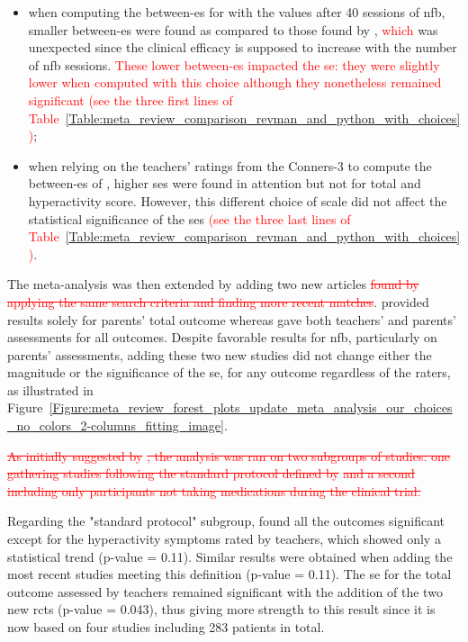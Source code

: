 \begin{itemize}
    \item when computing the between-\gls{es} for \citet{Arnold2014} with the values after 40 sessions of \gls{nfb}, 
      smaller between-\gls{es} were found as compared to those found by \citet{Cortese2016}, \textcolor{red}{which} was unexpected since  
			the clinical efficacy is supposed to increase with the number of \gls{nfb} sessions. \textcolor{red}{These lower between-\gls{es}
			impacted the \gls{se}: they were slightly lower when computed with this choice although they nonetheless remained significant (see the three first lines 
			of Table~\ref{Table:meta_review_comparison_revman_and_python_with_choices})};  
    \item when relying on the teachers' ratings from the Conners-3 to compute the between-\gls{es} of \citet{Steiner2014}, 
		higher \glspl{se} were found in attention but not for total and hyperactivity score. However, this different choice of 
		scale did not affect the statistical significance of the \glspl{se} \textcolor{red}{(see the three last lines 
			of Table~\ref{Table:meta_review_comparison_revman_and_python_with_choices})}.
\end{itemize}

The meta-analysis was then extended by adding two new articles \citep{Strehl2017, Baumeister2016} \textcolor{red}{\sout{found 
by applying the same search criteria and finding more recent matches}}. \citet{Baumeister2016} provided results 
solely for parents' total outcome whereas \citet{Strehl2017} gave both teachers' and parents' assessments for all outcomes. 
Despite favorable results for \gls{nfb}, particularly on parents' assessments, adding these two new studies did not 
change either the magnitude or the significance of the \gls{se}, for any outcome regardless of the raters,
as illustrated in Figure~\ref{Figure:meta_review_forest_plots_update_meta_analysis_our_choices_no_colors_2-columns_fitting_image}. 
 
\textcolor{red}{\sout{As initially suggested by }}\citeauthor{Cortese2016}\textcolor{red}{\sout{, the analysis was ran on two subgroups of studies: one gathering 
studies following the standard protocol defined by }} \citet{Arns2014} \textcolor{red}{\sout{and a second including only participants not taking medications 
during the clinical trial. }}

Regarding the "standard protocol" subgroup, \citet{Cortese2016} found all the outcomes significant except for the 
hyperactivity symptoms rated by teachers, which showed only a statistical trend (p-value = 0.11). Similar results 
were obtained when adding the most recent studies meeting this definition \citep{Strehl2017} (p-value = 0.11). 
The \gls{se} for the total outcome assessed by teachers remained significant with the addition of the two new
\glspl{rct} (p-value = 0.043), thus giving more strength to this result since it is now based on four studies including 283
patients in total.

